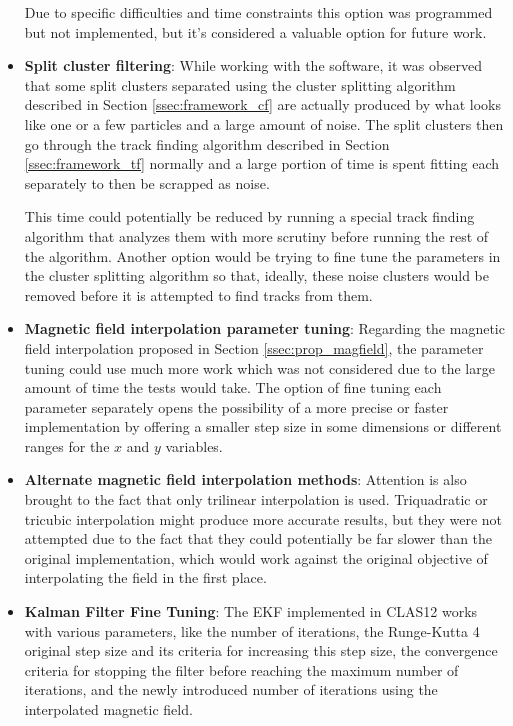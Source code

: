 \begin{itemize}
        Due to specific difficulties and time constraints this option was programmed but not implemented, but it's considered a valuable option for future work.
    
        \item \textbf{Split cluster filtering}: While working with the software, it was observed that some split clusters separated using the cluster splitting algorithm described in Section \ref{ssec:framework_cf} are actually produced by what looks like one or a few particles and a large amount of noise.
        The split clusters then go through the track finding algorithm described in Section \ref{ssec:framework_tf} normally and a large portion of time is spent fitting each separately to then be scrapped as noise.
        
        This time could potentially be reduced by running a special track finding algorithm that analyzes them with more scrutiny before running the rest of the algorithm.
        Another option would be trying to fine tune the parameters in the cluster splitting algorithm so that, ideally, these noise clusters would be removed before it is attempted to find tracks from them.
    
        \item \textbf{Magnetic field interpolation parameter tuning}: Regarding the magnetic field interpolation proposed in Section \ref{ssec:prop_magfield}, the parameter tuning could use much more work which was not considered due to the large amount of time the tests would take.
        The option of fine tuning each parameter separately opens the possibility of a more precise or faster implementation by offering a smaller step size in some dimensions or different ranges for the $x$ and $y$ variables.
        
        \item \textbf{Alternate magnetic field interpolation methods}: Attention is also brought to the fact that only trilinear interpolation is used.
        Triquadratic or tricubic interpolation might produce more accurate results, but they were not attempted due to the fact that they could potentially be far slower than the original implementation, which would work against the original objective of interpolating the field in the first place.
        
        \item \textbf{Kalman Filter Fine Tuning}: The EKF implemented in CLAS12 works with various parameters, like the number of iterations, the Runge-Kutta 4 original step size and its criteria for increasing this step size, the convergence criteria for stopping the filter before reaching the maximum number of iterations, and the newly introduced number of iterations using the interpolated magnetic field.


\end{itemize}

